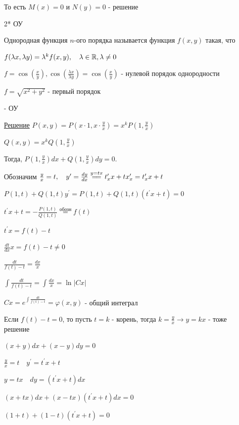 \documentclass[12pt]{article}
\begin{document}
    То есть $M(x) = 0$ и $N(y) = 0$ - решение

    2* ОУ

     Однородная функция $n$-ого порядка называется функция $f(x, y)$ такая, что

    $f(\lambda x, \lambda y) = \lambda^k f(x, y), \quad \lambda \in \mathbb{R}, \lambda \neq 0$

    \Ex $f = \cos\left(\frac{x}{y}\right), \cos(\frac{\lambda x}{\lambda y}) = \cos(\frac{x}{y})$ - нулевой порядок однородности

    $f = \sqrt{x^2 + y^2}$ - первый порядок

      - ОУ

    \underline{Решение} $P(x, y) = P\left(x \cdot 1, x \cdot \frac{y}{x}\right) = x^k P\left(1, \frac{y}{x}\right)$

    $Q(x, y) = x^k Q\left(1, \frac{y}{x}\right)$

    Тогда, $P\left(1, \frac{y}{x}\right)dx + Q\left(1, \frac{y}{x}\right)dy = 0$.

    Обозначим $\frac{y}{x} = t, \quad y^\prime = \frac{dy}{dx} \stackrel{y = tx}{=\joinrel=} t^\prime_x x + t x^\prime_x = t^\prime_x x + t$

    $P(1, t) + Q(1, t)y^\prime = P(1, t) + Q(1, t)(t^\prime x + t) = 0$

    $t^\prime x + t = -\frac{P(1, t)}{Q(1, t)} \stackrel{\text{обозн}}{=} f(t)$

    $t^\prime x = f(t) - t$

    $\frac{dt}{dx}x = f(t) - t \neq 0$

    $\frac{dt}{f(t) - t} = \frac{dx}{x}$

    $\int\frac{dt}{f(t) - t} = \int\frac{dx}{x} = \ln|Cx|$

    $Cx = e^{\int\frac{dt}{f(t) - t}} = \varphi(x, y)$ - общий интеграл

    Если $f(t) - t = 0$, то пусть $t = k$ - корень, тогда $k = \frac{y}{x} \to y = kx$ - тоже решение

    \Ex $(x + y)dx + (x - y)dy = 0$

    $\frac{y}{x} = t \quad y^\prime = t^\prime x + t$

    $y = tx \quad dy = (t^\prime x + t)dx$

    $(x + tx)dx + (x - tx)(t^\prime x + t)dx = 0$

    $(1 + t) + (1 - t)(t^\prime x + t) = 0$
\end{document}
